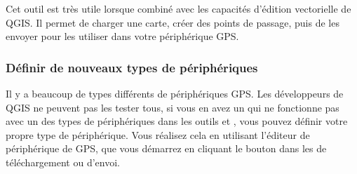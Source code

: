 Cet outil est très utile lorsque combiné avec les capacités d'édition vectorielle de QGIS. Il permet de charger une carte, créer des points de passage, puis de les envoyer pour les utiliser dans votre périphérique GPS.

\subsubsection{\label{sec:Defining-new-device}Définir de nouveaux types de périphériques}

Il y a beaucoup de types différents de périphériques GPS.
Les développeurs de QGIS ne peuvent pas les tester tous, si vous en avez un qui ne fonctionne pas avec un des types de périphériques dans les outils
 et , vous pouvez définir votre propre type de périphérique.
Vous réalisez cela en utilisant l'éditeur de périphérique de GPS, que vous démarrez en cliquant le bouton  dans les
de téléchargement ou d'envoi.

